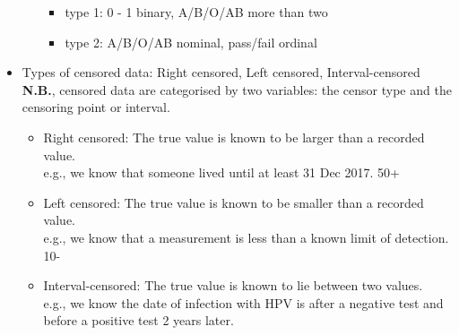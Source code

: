 \documentclass[12pt]{book}
\begin{document}
\begin{itemize}
\begin{itemize}
\begin{itemize}
\item type 1: 0 - 1 binary, A/B/O/AB more than two
\item type 2: A/B/O/AB nominal, pass/fail ordinal
\end{itemize}
\end{itemize}
\item Types of censored data: Right censored, Left censored, Interval-censored \\
\textbf{N.B.}, censored data are categorised by two variables: the censor type and the censoring point or interval.
\begin{itemize}
\item Right censored: The true value is known to be larger than a recorded value. \\
e.g., we know that someone lived until at least 31 Dec 2017. 50+
\item Left censored: The true value is known to be smaller than a recorded value. \\
e.g., we know that a measurement is less than a known limit of detection. 10-
\item Interval-censored: The true value is known to lie between two values. \\
e.g., we know the date of infection with HPV is after a negative test and before a positive test 2 years later.
\end{itemize}
\end{itemize}

\newpage

\pagestyle{fancy}
\end{document}
